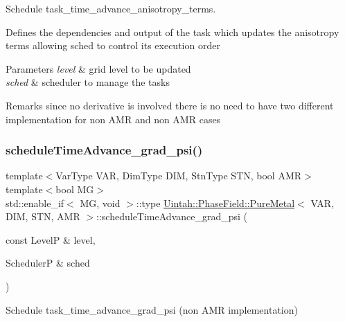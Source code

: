 Schedule task\+\_\+time\+\_\+advance\+\_\+anisotropy\+\_\+terms. 

Defines the dependencies and output of the task which updates the anisotropy terms allowing sched to control its execution order


\begin{DoxyParams}{Parameters}
{\em level} & grid level to be updated \\
\hline
{\em sched} & scheduler to manage the tasks\\
\hline
\end{DoxyParams}
\begin{DoxyRemark}{Remarks}
since no derivative is involved there is no need to have two different implementation for non A\+MR and non A\+MR cases 
\end{DoxyRemark}
\mbox{\label{classUintah_1_1PhaseField_1_1PureMetal_a4567da5b0cded42b606b75572f3b0599}} 
\subsubsection{\texorpdfstring{schedule\+Time\+Advance\+\_\+grad\+\_\+psi()}{scheduleTimeAdvance\_grad\_psi()}\hspace{0.1cm}{\footnotesize\ttfamily [1/2]}}
{\footnotesize\ttfamily template$<$Var\+Type V\+AR, Dim\+Type D\+IM, Stn\+Type S\+TN, bool A\+MR$>$ \\
template$<$bool MG$>$ \\
std\+::enable\+\_\+if$<$ MG, void $>$\+::type \hyperlink{classUintah_1_1PhaseField_1_1PureMetal}{Uintah\+::\+Phase\+Field\+::\+Pure\+Metal}$<$ V\+AR, D\+IM, S\+TN, A\+MR $>$\+::schedule\+Time\+Advance\+\_\+grad\+\_\+psi (\begin{DoxyParamCaption}\item[{const LevelP \&}]{level,  }\item[{SchedulerP \&}]{sched }\end{DoxyParamCaption})\hspace{0.3cm}{\ttfamily [protected]}}



Schedule task\+\_\+time\+\_\+advance\+\_\+grad\+\_\+psi (non A\+MR implementation) 


